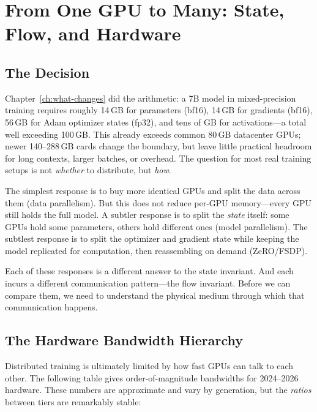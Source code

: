 \section{From One GPU to Many: State, Flow, and Hardware}
\label{sec:one-to-many}

\subsection{The Decision}

Chapter~\ref{ch:what-changes} did the arithmetic: a 7B model in mixed-precision training requires roughly 14\,GB for parameters (bf16), 14\,GB for gradients (bf16), 56\,GB for Adam optimizer states (fp32), and tens of GB for activations---a total well exceeding 100\,GB. This already exceeds common 80\,GB datacenter GPUs; newer 140--288\,GB cards change the boundary, but leave little practical headroom for long contexts, larger batches, or overhead. The question for most real training setups is not \emph{whether} to distribute, but \emph{how}.

The simplest response is to buy more identical GPUs and split the data across them (data parallelism). But this does not reduce per-GPU memory---every GPU still holds the full model. A subtler response is to split the \emph{state} itself: some GPUs hold some parameters, others hold different ones (model parallelism). The subtlest response is to split the optimizer and gradient state while keeping the model replicated for computation, then reassembling on demand (ZeRO/FSDP).

Each of these responses is a different answer to the state invariant. And each incurs a different communication pattern---the flow invariant. Before we can compare them, we need to understand the physical medium through which that communication happens.


\subsection{The Hardware Bandwidth Hierarchy}
\label{sec:bandwidth-hierarchy}

Distributed training is ultimately limited by how fast GPUs can talk to each other. The following table gives order-of-magnitude bandwidths for 2024--2026 hardware. These numbers are approximate and vary by generation, but the \emph{ratios} between tiers are remarkably stable:

